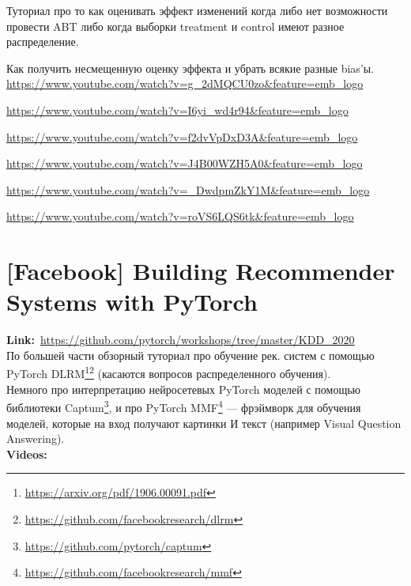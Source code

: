 Туториал про то как оценивать эффект изменений когда либо нет возможности провести ABT либо когда выборки treatment и control имеют разное распределение.

Как получить несмещенную оценку эффекта и убрать всякие разные bias'ы. \\

\url{https://www.youtube.com/watch?v=g_2dMQCU0zo&feature=emb_logo}

\url{https://www.youtube.com/watch?v=I6yi_wd4r94&feature=emb_logo}

\url{https://www.youtube.com/watch?v=f2dvVpDxD3A&feature=emb_logo}

\url{https://www.youtube.com/watch?v=J4B00WZH5A0&feature=emb_logo}

\url{https://www.youtube.com/watch?v=_DwdpmZkY1M&feature=emb_logo}

\url{https://www.youtube.com/watch?v=roVS6LQS6tk&feature=emb_logo}


\section*{[Facebook] Building Recommender Systems with PyTorch} 

\textbf{Link:}~\url{https://github.com/pytorch/workshops/tree/master/KDD_2020} \\

По большей части обзорный туториал про обучение рек. систем с помощью PyTorch DLRM\footnote{\url{https://arxiv.org/pdf/1906.00091.pdf}}\footnote{\url{https://github.com/facebookresearch/dlrm}} (касаются вопросов распределенного обучения). \\

Немного про интерпретацию нейросетевых PyTorch моделей с помощью библиотеки Captum\footnote{\url{https://github.com/pytorch/captum}}, и про PyTorch MMF\footnote{\url{https://github.com/facebookresearch/mmf}} --- фрэймворк для обучения моделей, которые на вход получают картинки И текст (например Visual Question Answering).  \\

\textbf{Videos:}

